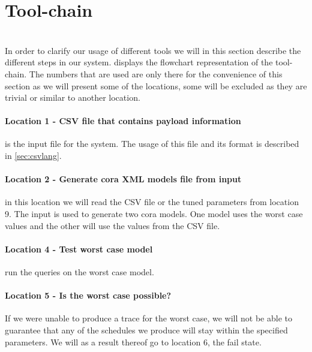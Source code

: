 \section{Tool-chain} \label{sec:tool_chain}
\\
In order to clarify our usage of different tools we will in this section describe the different steps in our system.  displays the flowchart representation of the tool-chain. The numbers that are used are only there for the convenience of this section as we will present some of the locations, some will be excluded as they are trivial or similar to another location. 

\paragraph{Location 1 - CSV file that contains payload information} is the input file for the system. The usage of this file and its format is described in \cref{sec:csvlang}.

\paragraph{Location 2 - Generate \gls{cora} XML models file from input} in this location we will read the CSV file or the tuned parameters from location 9. The input is used to generate two \gls{cora} models. One model uses the worst case values and the other will use the values from the CSV file. 


\paragraph{Location 4 - Test worst case model} run the queries on the worst case model.

\paragraph{Location 5 - Is the worst case possible?} If we were unable to produce a trace for the worst case, we will not be able to guarantee that any of the schedules we produce will stay within the specified parameters. We will as a result thereof go to location 6, the fail state.

